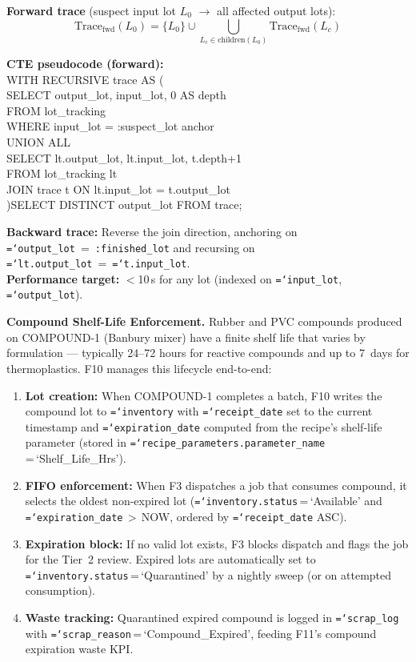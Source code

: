 \documentclass[11pt]{article}
\newcommand{\tfield}[1]{\texttt{\hyphenchar\font=`\-\relax #1}}
\begin{document}
\begin{eqbox}
\textbf{Forward trace} (suspect input lot $L_0$ $\to$ all affected output lots):
\[
\text{Trace}_{\text{fwd}}(L_0) = \{L_0\} \cup \bigcup_{L_c \in \text{children}(L_0)} \text{Trace}_{\text{fwd}}(L_c)
\]

\textbf{CTE pseudocode (forward):}\\[2pt]
{\small\ttfamily
WITH RECURSIVE trace AS (\\
\quad SELECT output\_lot, input\_lot, 0 AS depth\\
\quad FROM lot\_tracking\\
\quad WHERE input\_lot = :suspect\_lot \quad {-}{-} anchor\\
\quad UNION ALL\\
\quad SELECT lt.output\_lot, lt.input\_lot, t.depth+1\\
\quad FROM lot\_tracking lt\\
\quad JOIN trace t ON lt.input\_lot = t.output\_lot\\
)\;SELECT DISTINCT output\_lot FROM trace;
}

\textbf{Backward trace:} Reverse the join direction, anchoring on \tfield{output\_lot}~=~\texttt{:finished\_lot} and recursing on \tfield{lt.output\_lot}~=~\tfield{t.input\_lot}.\\[2pt]
\textbf{Performance target:} $<$10\,s for any lot (indexed on \tfield{input\_lot}, \tfield{output\_lot}).
\end{eqbox}

\textbf{Compound Shelf-Life Enforcement.}
Rubber and PVC compounds produced on COMPOUND-1 (Banbury mixer) have a finite shelf life that varies by formulation --- typically 24--72 hours for reactive compounds and up to 7~days for thermoplastics.  F10 manages this lifecycle end-to-end:

\begin{enumerate}[leftmargin=2em, itemsep=1pt]
\item \textbf{Lot creation:} When COMPOUND-1 completes a batch, F10 writes the compound lot to \tfield{inventory} with \tfield{receipt\_date} set to the current timestamp and \tfield{expiration\_date} computed from the recipe's shelf-life parameter (stored in \tfield{recipe\_\allowbreak parameters.parameter\_name}\,=\,`Shelf\_Life\_Hrs').
\item \textbf{FIFO enforcement:} When F3 dispatches a job that consumes compound, it selects the oldest non-expired lot (\tfield{inventory.status}\,=\,`Available' and \tfield{expiration\_date}\,$>$\,NOW, ordered by \tfield{receipt\_date} ASC).
\item \textbf{Expiration block:} If no valid lot exists, F3 blocks dispatch and flags the job for the Tier~2 review.  Expired lots are automatically set to \tfield{inventory.status}\,=\,`Quarantined' by a nightly sweep (or on attempted consumption).
\item \textbf{Waste tracking:} Quarantined expired compound is logged in \tfield{scrap\_log} with \tfield{scrap\_reason}\,=\,`Compound\_Expired', feeding F11's compound expiration waste KPI.
\end{enumerate}
\end{document}
